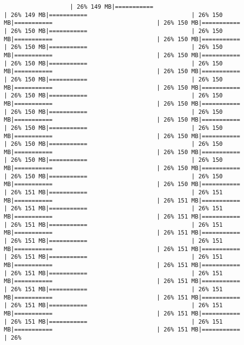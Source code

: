 \documentclass[
]{article}
\begin{document}
\begin{verbatim}
                   | 26% 149 MB|===========                              | 26% 149 MB|===========                              | 26% 150 MB|===========                              | 26% 150 MB|===========                              | 26% 150 MB|===========                              | 26% 150 MB|===========                              | 26% 150 MB|===========                              | 26% 150 MB|===========                              | 26% 150 MB|===========                              | 26% 150 MB|===========                              | 26% 150 MB|===========                              | 26% 150 MB|===========                              | 26% 150 MB|===========                              | 26% 150 MB|===========                              | 26% 150 MB|===========                              | 26% 150 MB|===========                              | 26% 150 MB|===========                              | 26% 150 MB|===========                              | 26% 150 MB|===========                              | 26% 150 MB|===========                              | 26% 150 MB|===========                              | 26% 150 MB|===========                              | 26% 150 MB|===========                              | 26% 150 MB|===========                              | 26% 150 MB|===========                              | 26% 150 MB|===========                              | 26% 150 MB|===========                              | 26% 150 MB|===========                              | 26% 150 MB|===========                              | 26% 150 MB|===========                              | 26% 150 MB|===========                              | 26% 150 MB|===========                              | 26% 150 MB|===========                              | 26% 150 MB|===========                              | 26% 151 MB|===========                              | 26% 151 MB|===========                              | 26% 151 MB|===========                              | 26% 151 MB|===========                              | 26% 151 MB|===========                              | 26% 151 MB|===========                              | 26% 151 MB|===========                              | 26% 151 MB|===========                              | 26% 151 MB|===========                              | 26% 151 MB|===========                              | 26% 151 MB|===========                              | 26% 151 MB|===========                              | 26% 151 MB|===========                              | 26% 151 MB|===========                              | 26% 151 MB|===========                              | 26% 151 MB|===========                              | 26% 151 MB|===========                              | 26% 151 MB|===========                              | 26% 151 MB|===========                              | 26% 151 MB|===========                              | 26% 151 MB|===========                              | 26% 151 MB|===========                              | 26% 151 MB|===========                              | 26% 151 MB|===========                              | 26% 151 MB|===========                              | 26% 151 MB|===========                              | 26% 151 MB|===========                              | 26% 
\end{verbatim}
\end{document}

